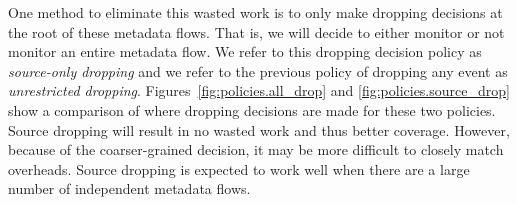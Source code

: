 One method to eliminate this wasted work is to only make dropping decisions at
the root of these metadata flows. That is, we will decide to either monitor or
not monitor an entire metadata flow. We refer to this dropping decision policy
as \emph{source-only dropping} and we refer to the previous policy of 
dropping any event as \emph{unrestricted dropping}.
Figures~\ref{fig:policies.all_drop} and \ref{fig:policies.source_drop} show a
comparison of where dropping decisions are made for these two policies. Source
dropping will
result in no wasted work and thus better coverage. However, because of the coarser-grained decision, it
may be more difficult to closely match overheads. Source dropping is expected
to work well when there are a large number of independent metadata flows.

\begin{figure}
  \begin{center}

\end{center}
\end{figure}
